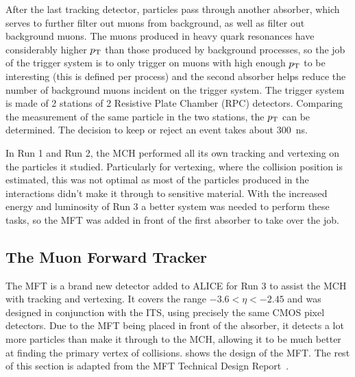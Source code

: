 After the last tracking detector, particles pass through another absorber, which serves to further filter out muons from background, as well as filter out background muons. The muons produced in heavy quark resonances have considerably higher $p_\mathrm{T}$ than those produced by background processes, so the job of the trigger system is to only trigger on muons with high enough $p_\mathrm{T}$ to be interesting (this is defined per process) and the second absorber helps reduce the number of background muons incident on the trigger system. The trigger system is made of 2 stations of 2 Resistive Plate Chamber (RPC) detectors. Comparing the measurement of the same particle in the two stations, the $p_\mathrm{T}$ can be determined. The decision to keep or reject an event takes about \SI{300}{\nano\second}.

In Run 1 and Run 2, the MCH performed all its own tracking and vertexing on the particles it studied. Particularly for vertexing, where the collision position is estimated, this was not optimal as most of the particles produced in the interactions didn't make it through to sensitive material. With the increased energy and luminosity of Run 3 a better system was needed to perform these tasks, so the MFT was added in front of the first absorber to take over the job.


\subsection{The Muon Forward Tracker}\label{sec:MFT_Theory}
The MFT is a brand new detector added to ALICE for Run 3 to assist the MCH with tracking and vertexing. It covers the range $-3.6<\eta<-2.45$ and was designed in conjunction with the ITS, using precisely the same CMOS pixel detectors. Due to the MFT being placed in front of the absorber, it detects a lot more particles than make it through to the MCH, allowing it to be much better at finding the primary vertex of collisions.  shows the design of the MFT. The rest of this section is adapted from the MFT Technical Design Report~\cite{MFT_TDR}. 

